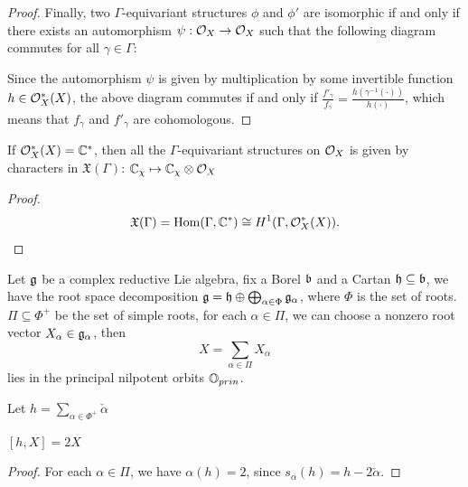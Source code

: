\begin{proof}
  Finally, two $\Gamma$-equivariant structures $\phi$ and $\phi'$ are isomorphic if and only if there exists an automorphism $\psi: \mathcal{O}_X \to \mathcal{O}_X$ such that the following diagram commutes for all $\gamma \in \Gamma$:
\begin{center}\end{center}
Since the automorphism $\psi$ is given by multiplication by some invertible function $h \in \mathcal{O}^{*}_X(X)$, the above diagram commutes if and only if $\frac{f'_{\gamma}}{f_{\gamma}} = \frac{h(\gamma^{-1}(\cdot))}{h(\cdot)}$, which means that $f_{\gamma}$ and $f'_{\gamma}$ are cohomologous.
\end{proof}

\begin{cor}
  If $\mathcal{O}^{*}_X(X) = \mathbb{C}^{*}$, then all the $\Gamma$-equivariant structures on $\mathcal{O}_X$ is given by characters in $\mathfrak{X}(\Gamma)$: $\mathbb{C}_{\chi} \mapsto \mathbb{C}_{\chi} \otimes \mathcal{O}_X$

\end{cor}



\begin{proof}
  \[
    \mathfrak{X}(\Gamma) = \operatorname{Hom}(\Gamma, \mathbb{C}^{*}) \cong H^1(\Gamma, \mathcal{O}^{*}_X(X)).
  \]
\end{proof}



Let $\mathfrak{g}$ be a complex reductive Lie algebra, fix a Borel $\mathfrak{b}$ and a Cartan $\mathfrak{h} \subseteq \mathfrak{b}$, we have the root space decomposition $\mathfrak{g} = \mathfrak{h} \oplus \bigoplus_{\alpha \in \Phi} \mathfrak{g}_{\alpha}$, where $\Phi$ is the set of roots. $\Pi \subseteq \Phi^{+}$ be the set of simple roots, for each $\alpha \in \Pi$, we can choose a nonzero root vector $X_{\alpha} \in \mathfrak{g}_{\alpha}$, then
\[
  X = \sum_{\alpha \in \Pi} X_{\alpha}
\]
lies in the principal nilpotent orbits $\mathbb{O}_{prin}$.

Let $h = \sum_{\alpha \in \Phi^+} \check{\alpha}$

\begin{lem}
  $[h, X] = 2X$
\end{lem}


\begin{proof}
  For each $\alpha \in \Pi$, we have $\alpha(h) = 2$, since $s_{\alpha}(h) = h - 2\check{\alpha}$.
\end{proof}


